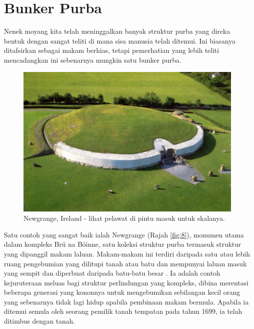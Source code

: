 \documentclass[10pt,twocolumn,letterpaper]{article}
\begin{document}
\section{Bunker Purba}

Nenek moyang kita telah meninggalkan banyak struktur purba yang direka bentuk dengan sangat teliti di mana sisa manusia telah ditemui. Ini biasanya ditafsirkan sebagai makam berhias, tetapi pemerhatian yang lebih teliti mencadangkan ini sebenarnya mungkin satu bunker purba.

\begin{figure}[b]
\begin{center}
   \includegraphics[width=1\linewidth]{ww19.jpg}
\end{center}
   \caption{Newgrange, Ireland - lihat pelawat di pintu masuk untuk skalanya.}
\label{fig:8}
\label{fig:onecol}
\end{figure}

Satu contoh yang sangat baik ialah Newgrange (Rajah \ref{fig:8}), monumen utama dalam kompleks Brú na Bóinne, satu koleksi struktur purba termasuk struktur yang dipanggil makam laluan. Makam-makam ini terdiri daripada satu atau lebih ruang pengebumian yang dilitupi tanah atau batu dan mempunyai laluan masuk yang sempit dan diperbuat daripada batu-batu besar \cite{70}. Ia adalah contoh kejuruteraan meluas bagi struktur perlindungan yang kompleks, dibina merentasi beberapa generasi yang kononnya untuk mengebumikan sebilangan kecil orang yang sebenarnya tidak lagi hidup apabila pembinaan makam bermula. Apabila ia ditemui semula oleh seorang pemilik tanah tempatan pada tahun 1699, ia telah ditimbus dengan tanah.
\end{document}
